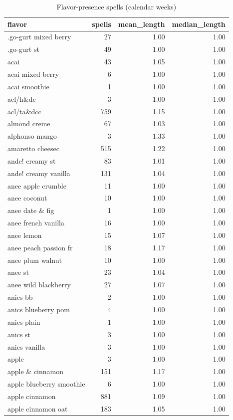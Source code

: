 \begin{table}
\caption{Flavor-presence spells (calendar weeks)}
\begin{tabular}{lrrr}
\toprule
flavor & spells & mean\_length & median\_length \\
\midrule
.go-gurt mixed berry & 27 & 1.00 & 1.00 \\
.go-gurt st & 49 & 1.00 & 1.00 \\
acai & 43 & 1.05 & 1.00 \\
acai mixed berry & 6 & 1.00 & 1.00 \\
acai smoothie & 1 & 1.00 & 1.00 \\
acl/h\&dc & 3 & 1.00 & 1.00 \\
acl/ta\&dcc & 759 & 1.15 & 1.00 \\
almond creme & 67 & 1.03 & 1.00 \\
alphonso mango & 3 & 1.33 & 1.00 \\
amaretto cheesec & 515 & 1.22 & 1.00 \\
ande! creamy st & 83 & 1.01 & 1.00 \\
ande! creamy vanilla & 131 & 1.04 & 1.00 \\
anee apple crumble & 11 & 1.00 & 1.00 \\
anee coconut & 10 & 1.00 & 1.00 \\
anee date \& fig & 1 & 1.00 & 1.00 \\
anee french vanilla & 16 & 1.00 & 1.00 \\
anee lemon & 15 & 1.07 & 1.00 \\
anee peach passion fr & 18 & 1.17 & 1.00 \\
anee plum walnut & 10 & 1.00 & 1.00 \\
anee st & 23 & 1.04 & 1.00 \\
anee wild blackberry & 27 & 1.07 & 1.00 \\
anics bb & 2 & 1.00 & 1.00 \\
anics blueberry pom & 4 & 1.00 & 1.00 \\
anics plain & 1 & 1.00 & 1.00 \\
anics st & 3 & 1.00 & 1.00 \\
anics vanilla & 3 & 1.00 & 1.00 \\
apple & 3 & 1.00 & 1.00 \\
apple \& cinnamon & 151 & 1.17 & 1.00 \\
apple blueberry smoothie & 6 & 1.00 & 1.00 \\
apple cinnamon & 881 & 1.09 & 1.00 \\
apple cinnamon oat & 183 & 1.05 & 1.00 \\

\end{tabular}
\end{table}
